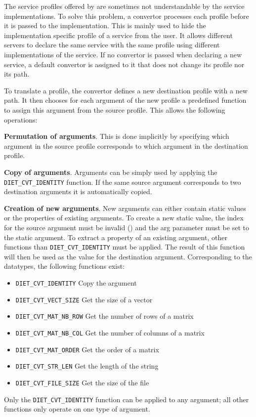 The service profiles offered by \diet are sometimes not understandable by the
service implementations. To solve this problem, a convertor processes each
profile before it is passed to the implementation. This is mainly used to hide
the implementation specific profile of a service from the user. It allows
different servers to declare the same service with the same profile using
different implementations of the service. If no convertor
is passed when declaring a new service, a default convertor is assigned to it
that does not change its profile nor its path.

To translate a profile, the convertor defines a new destination profile with a
new path. It then chooses for each argument of the new profile a predefined
function to assign this argument from the source profile. This allows the
following operations:

\begin{description}
\item{\textbf{Permutation of arguments}}. This is done implicitly by specifying
  which argument in the source profile corresponds to which argument in the
  destination profile.
\item{\textbf{Copy of arguments}}. Arguments can be simply used by applying the
  \texttt{DIET\_CVT\_IDENTITY} function. If the same source argument
  corresponds to two destination arguments it is automatically copied.
\item{\textbf{Creation of new arguments}}. New arguments can either contain
  static values or the properties of existing arguments. To create a new static
  value, the index for the source argument must be invalid () and the arg
  parameter must be set to the static argument. To extract a property of an
  existing argument, other functions than \texttt{DIET\_CVT\_IDENTITY} must be
  applied. The result of this function will then be used as the value for the
  destination argument.  Corresponding to the \diet datatypes, the following
  functions exist: \\
\begin{itemize}
\item{\texttt{DIET\_CVT\_IDENTITY}} Copy the argument
\item{\texttt{DIET\_CVT\_VECT\_SIZE}} Get the size of a vector
\item{\texttt{DIET\_CVT\_MAT\_NB\_ROW}} Get the number of rows of a matrix
\item{\texttt{DIET\_CVT\_MAT\_NB\_COL}} Get the number of columns of a matrix
\item{\texttt{DIET\_CVT\_MAT\_ORDER}} Get the order of a matrix
\item{\texttt{DIET\_CVT\_STR\_LEN}} Get the length of the string
\item{\texttt{DIET\_CVT\_FILE\_SIZE}} Get the size of the file
\end{itemize}
Only the \texttt{DIET\_CVT\_IDENTITY} function can be applied to any argument;
all other functions only operate on one type of argument.

\end{description}

